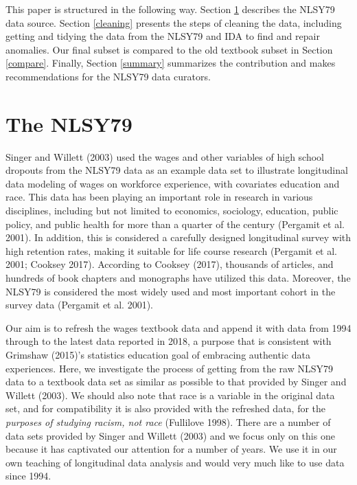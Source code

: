 \documentclass{article}
\begin{document}
This paper is structured in the following way. Section \ref{database} describes the NLSY79 data source. Section \ref{cleaning} presents the steps of cleaning the data, including getting and tidying the data from the NLSY79 and IDA to find and repair anomalies. Our final subset is compared to the old textbook subset in Section \ref{compare}. Finally, Section \ref{summary} summarizes the contribution and makes recommendations for the NLSY79 data curators.

\hypertarget{database}{%
\section{The NLSY79}\label{database}}

Singer and Willett (2003) used the wages and other variables of high school dropouts from the NLSY79 data as an example data set to illustrate longitudinal data modeling of wages on workforce experience, with covariates education and race. This data has been playing an important role in research in various disciplines, including but not limited to economics, sociology, education, public policy, and public health for more than a quarter of the century (Pergamit et al. 2001). In addition, this is considered a carefully designed longitudinal survey with high retention rates, making it suitable for life course research (Pergamit et al. 2001; Cooksey 2017). According to Cooksey (2017), thousands of articles, and hundreds of book chapters and monographs have utilized this data. Moreover, the NLSY79 is considered the most widely used and most important cohort in the survey data (Pergamit et al. 2001).

Our aim is to refresh the wages textbook data and append it with data from 1994 through to the latest data reported in 2018, a purpose that is consistent with Grimshaw (2015)'s statistics education goal of embracing authentic data experiences. Here, we investigate the process of getting from the raw NLSY79 data to a textbook data set as similar as possible to that provided by Singer and Willett (2003). We should also note that race is a variable in the original data set, and for compatibility it is also provided with the refreshed data, for the \emph{purposes of studying racism, not race} (Fullilove 1998). There are a number of data sets provided by Singer and Willett (2003) and we focus only on this one because it has captivated our attention for a number of years. We use it in our own teaching of longitudinal data analysis and would very much like to use data since 1994.
\end{document}
